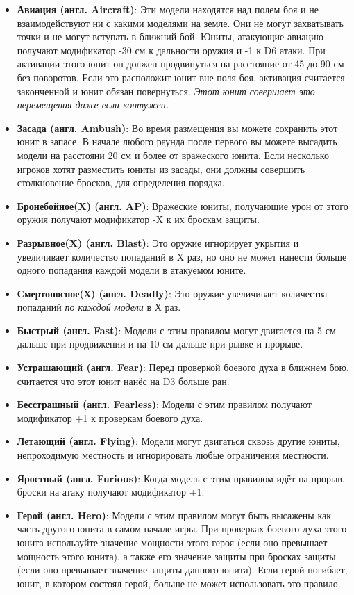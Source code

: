 \documentclass[twocolumn]{article}
\newcommand{\h}[1]{\textbf{#1}}
\newcommand{\D}[1][6]{D#1\xspace}
\begin{document}
\begin{itemize}
    \item \h{Авиация (англ. Aircraft)}: Эти модели находятся над полем боя и не взаимодействуют ни с какими моделями на земле. Они не могут захватывать точки и не могут вступать в ближний бой. Юниты, атакующие авиацию получают модификатор -30 см к дальности оружия и -1 к \D атаки. При активации этого юнит он должен продвинуться на расстояние от 45 до 90 см без поворотов. Если это расположит юнит вне поля боя, активация считается законченной и юнит обязан повернуться. \emph{Этот юнит совершает это перемещения даже если контужен.}
    \item \h{Засада (англ. Ambush)}: Во время размещения вы можете сохранить этот юнит в запасе. В начале любого раунда после первого вы можете высадить модели на расстояни 20 см и более от вражеского юнита. Если несколько игроков хотят разместить юниты из засады, они должны совершить столкновение бросков, для определения порядка.
    \item \h{Бронебойное(X) (англ. AP)}: Вражеские юниты, получающие урон от этого оружия получают модификатор -X к их броскам защиты.
    \item \h{Разрывное(X) (англ. Blast)}: Это оружие игнорирует укрытия и увеличивает количество попаданий в X раз, но оно не может нанести больше одного попадания каждой модели в атакуемом юните.
    \item \h{Смертоносное(Х) (англ. Deadly)}: Это оружие увеличивает количества попаданий \emph{по каждой модели} в Х раз.
    \item \h{Быстрый (англ. Fast)}: Модели с этим правилом могут двигается на 5 см дальше при продвижении и на 10 см дальше при рывке и прорыве.
    \item \h{Устрашающий (англ. Fear)}: Перед проверкой боевого духа в ближнем бою, считается что этот юнит нанёс на \D[3] больше ран.
    \item \h{Бесстрашный (англ. Fearless)}: Модели с этим правилом получают модификатор +1 к проверкам боевого духа.
    \item \h{Летающий (англ. Flying)}: Модели могут двигаться сквозь другие юниты, непроходимую местность и игнорировать любые ограничения местности.
    \item \h{Яростный (англ. Furious)}: Когда модель с этим правилом идёт на прорыв, броски на атаку получают модификатор +1.
    \item \h{Герой (англ. Hero)}: Модели с этим правилом могут быть высажены как часть другого юнита в самом начале игры. При проверках боевого духа этого юнита используйте значение мощности этого героя (если оно превышает мощность этого юнита), а также его значение защиты при бросках защиты (если оно превышает значение защиты данного юнита). Если герой погибает, юнит, в котором состоял герой, больше не может использовать это правило.

\end{itemize}
\end{document}
